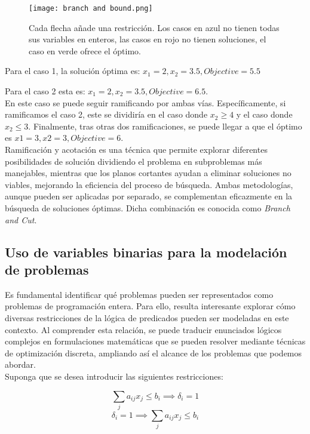 \documentclass[12pt]{report}
\begin{document}
\begin{figure}[ht]
    \centering
    \texttt{[image: branch and bound.png]}
    \caption{Cada flecha añade una restricción. Los casos en azul no tienen todas sus variables en enteros, las casos en rojo no tienen soluciones, el caso en verde ofrece el óptimo.}
    \label{fig:branch and bound}
\end{figure}

Para el caso 1, la solución óptima es: $x_1=2, x_2=3.5, Objective=5.5$

Para el caso 2 esta es: $x_1=2, x_2=3.5, Objective=6.5$.\\

En este caso se puede seguir ramificando por ambas vías. Específicamente, si ramificamos el caso 2, este se dividiría en el caso donde $x_2\geq 4$ y el caso donde $x_2\leq 3$. Finalmente, tras otras dos ramificaciones, se puede llegar a que el óptimo es $x1=3, x2=3, Objective=6$.\\

Ramificación y acotación es una técnica que permite explorar diferentes posibilidades de solución dividiendo el problema en subproblemas más manejables, mientras que los planos cortantes ayudan a eliminar soluciones no viables, mejorando la eficiencia del proceso de búsqueda. Ambas metodologías, aunque pueden ser aplicadas por separado, se complementan eficazmente en la búsqueda de soluciones óptimas. Dicha combinación es conocida como \textit{Branch and Cut}. 

\subsection{Uso de variables binarias para la modelación de problemas}


Es fundamental identificar qué problemas pueden ser representados como problemas de programación entera. Para ello, resulta interesante explorar cómo diversas restricciones de la lógica de predicados pueden ser modeladas en este contexto. Al comprender esta relación, se puede traducir enunciados lógicos complejos en formulaciones matemáticas que se pueden resolver mediante técnicas de optimización discreta, ampliando así el alcance de los problemas que podemos abordar.\\

Suponga que se desea introducir las siguientes restricciones:

$$ \sum_j a_{ij}x_j \leq  b_i \implies  \delta_i = 1$$
$$  \delta_i = 1 \implies  \sum_j a_{ij}x_j \leq  b_i$$
\end{document}
